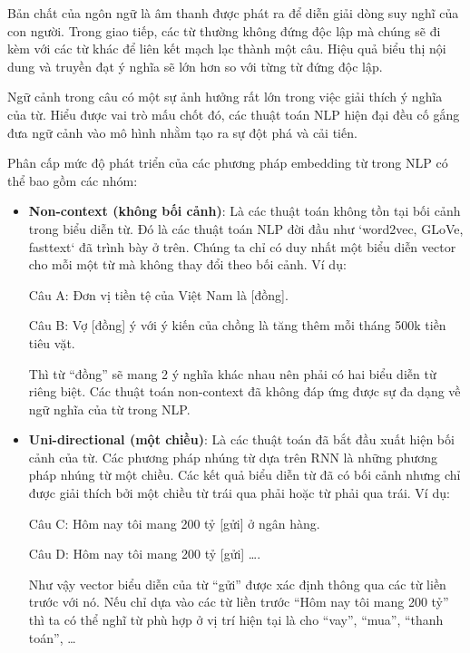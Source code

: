 Bản chất của ngôn ngữ là âm thanh được phát ra để diễn giải dòng suy nghĩ của con người. Trong giao tiếp, các từ thường không đứng độc lập mà chúng sẽ đi kèm với các từ khác để liên kết mạch lạc thành một câu. Hiệu quả biểu thị nội dung và truyền đạt ý nghĩa sẽ lớn hơn so với từng từ đứng độc lập\cite{webpage20}.

Ngữ cảnh trong câu có một sự ảnh hưởng rất lớn trong việc giải thích ý nghĩa của từ. Hiểu được vai trò mấu chốt đó, các thuật toán NLP hiện đại đều cố gắng đưa ngữ cảnh vào mô hình nhằm tạo ra sự đột phá và cải tiến.

Phân cấp mức độ phát triển của các phương pháp embedding từ trong NLP có thể bao gồm các nhóm:
\begin{itemize}
    \item \textbf{Non-context (không bối cảnh)}: Là các thuật toán không tồn tại bối cảnh trong biểu diễn từ. Đó là các thuật toán NLP đời đầu như `word2vec, GLoVe, fasttext` đã trình bày ở trên. Chúng ta chỉ có duy nhất một biểu diễn vector cho mỗi một từ mà không thay đổi theo bối cảnh. Ví dụ:

          Câu A: Đơn vị tiền tệ của Việt Nam là [đồng].

          Câu B: Vợ [đồng] ý với ý kiến của chồng là tăng thêm mỗi tháng 500k tiền tiêu vặt.

          Thì từ ``đồng'' sẽ mang 2 ý nghĩa khác nhau nên phải có hai biểu diễn từ riêng biệt. Các thuật toán non-context đã không đáp ứng được sự đa dạng về ngữ nghĩa của từ trong NLP.

    \item \textbf{Uni-directional (một chiều)}: Là các thuật toán đã bắt đầu xuất hiện bối cảnh của từ. Các phương pháp nhúng từ dựa trên RNN là những phương pháp nhúng từ một chiều. Các kết quả biểu diễn từ đã có bối cảnh nhưng chỉ được giải thích bởi một chiều từ trái qua phải hoặc từ phải qua trái. Ví dụ:

          Câu C: Hôm nay tôi mang 200 tỷ [gửi] ở ngân hàng.

          Câu D: Hôm nay tôi mang 200 tỷ [gửi] \dots.

          Như vậy vector biểu diễn của từ ``gửi'' được xác định thông qua các từ liền trước với nó. Nếu chỉ dựa vào các từ liền trước ``Hôm nay tôi mang 200 tỷ'' thì ta có thể nghĩ từ phù hợp ở vị trí hiện tại là cho ``vay'', ``mua'', ``thanh toán'', \dots


\end{itemize}
